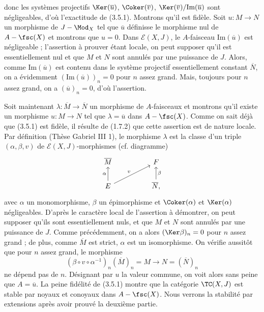 donc les systèmes projectifs $\Ker (\overline{u})$, $\Coker (\overline{v})$, $\Ker (\overline{v})/\text{Im} (\overline{u})$ sont négligeables, d'où l'exactitude de (3.5.1). Montrons qu'il est fidèle. Soit $u: M \to N$ un morphisme de $J-\Mod_X$ tel que $\overline{u}$ définisse le morphisme nul de $A-\fsc(X)$ et montrons que $u = 0$. Dans $\mathcal{E}(X, J)$, le $A$-faisceau $\text{Im}(\overline{u})$ est négligeable ; l'assertion à prouver étant locale, on peut supposer qu'il est essentiellement nul et que $M$ et $N$ sont annulés par une puissance de $J$. Alors, comme $\text{Im}(\overline{u})$ est contenu dans le système projectif essentiellement constant $\overline{N}$, on a évidemment $(\text{Im}(\overline{u}))_n = 0$ pour $n$ assez grand. Mais, toujours pour $n$ assez grand, on a $(\overline{u})_n = 0$, d'où l'assertion.

Soit maintenant $\lambda: \overline{M} \to \overline{N}$ un morphisme de $A$-faisceaux et montrons qu'il existe un morphisme $u: M \to N$ tel que $\lambda = \overline{u}$ dans $A-\fsc(X)$. Comme on sait déjà que (3.5.1) est fidèle, il résulte de (1.7.2) que cette assertion est de nature locale. Par définition (Thèse Gabriel III 1), le morphisme $\lambda$ est la classe d'un triple $(\alpha, \beta, v)$ de $\mathcal{E}(X, J)$-morphismes (cf. diagramme)
\[\begin{tikzcd}
	{\overline{M}} && F \\
	E && {\overline{N},}
	\arrow["\beta"', from=2-3, to=1-3]
	\arrow["v", from=2-1, to=1-3]
	\arrow["\alpha", from=2-1, to=1-1]
\end{tikzcd}\]
avec $\alpha$ un monomorphisme, $\beta$ un épimorphisme et $\Coker(\alpha)$ et $\Ker (\alpha)$ négligeables. D'après le caractère local de l'assertion à démontrer, on peut supposer qu'ils sont essentiellement nuls, et que $M$ et $N$ sont annulés par une puissance de $J$. Comme précédemment, on a alors $(\Ker \beta)_n = 0$ pour $n$ assez grand ; de plus, comme $\overline{M}$ est strict, $\alpha$ est un isomorphisme. On vérifie aussitôt que pour $n$ assez grand, le morphisme
$$
(\beta \circ v \circ \alpha^{-1})_n (\overline{M})_n = M \to N = (\overline{N})_n
$$
ne dépend pas de $n$. Désignant par $u$ la valeur commune, on voit alors sans peine que $A = \overline{u}$. La peine fidélité de (3.5.1) montre que la catégorie $\TC (X, J)$ est stable par noyaux et conoyaux dans $A-\fsc(X)$. Nous verrons la stabilité par extensions après avoir prouvé la deuxième partie.

